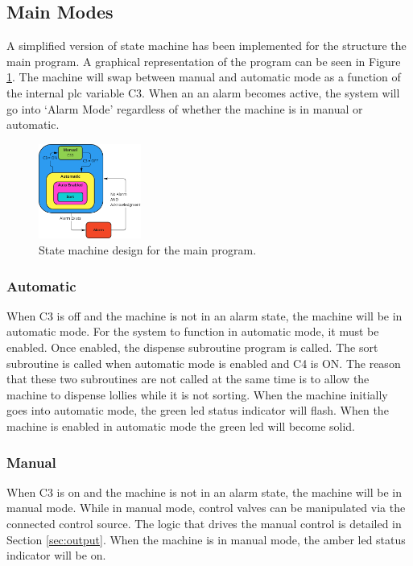     \subsection{Main Modes}
    A simplified version of state machine has been implemented for the structure the main program. A graphical representation of the program can be seen in Figure \ref{fig:mainStateMachine}. The machine will swap between manual and automatic mode as a function of the internal \acrshort{plc} variable C3. When an an alarm becomes active, the system will go into `Alarm Mode' regardless of whether the machine is in manual or automatic. 
    
        \begin{figure}[H]
            \centering
            \includegraphics[width = 0.3\textwidth]{2_images/mainStateMachine}
            \caption{State machine design for the main program.}
            \label{fig:mainStateMachine}
        \end{figure}
    
        \subsubsection{Automatic}
            When C3 is off and the machine is not in an alarm state, the machine will be in automatic mode. For the system to function in automatic mode, it must be enabled.  Once enabled, the dispense subroutine program is called. The sort subroutine is called when automatic mode is enabled and C4 is ON. The reason that these two subroutines are not called at the same time is to allow the machine to dispense lollies while it is not sorting. 
            When the machine initially goes into automatic mode, the green \acrshort{led} status indicator will flash. When the machine is enabled in automatic mode the green \acrshort{led} will become solid.

        \subsubsection{Manual}
            When C3 is on and the machine is not in an alarm state, the machine will be in manual mode. While in manual mode, control valves can be manipulated via the connected control source. The logic that drives the manual control is detailed in Section \ref{sec:output}.
            When the machine is in manual mode, the amber \acrshort{led} status indicator will be on. 

